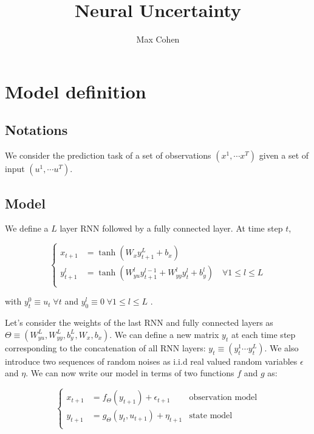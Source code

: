 \documentclass[10pt,a4paper]{report}
\begin{document}
\title{Neural Uncertainty}
\author{Max Cohen}
\maketitle

\chapter{Model definition}
\section{Notations}
We consider the prediction task of a set of observations $(x^1, \cdots x^T)$ given a set of input $(u^1, \cdots u^T)$.

\section{Model}
We define a $L$ layer RNN followed by a fully connected layer. At time step $t$,

\begin{equation*}
    \left\{
    \begin{aligned}
        x_{t+1}   & = \tanh(W_x y_{t+1}^L + b_x)                                                               \\
        y_{t+1}^l & = \tanh(W_{yu}^l y^{l-1}_{t+1} + W_{yy}^l y^{l}_{t} + b_y^l) \quad \forall 1 \leq l \leq L \\
    \end{aligned}
    \right.
\end{equation*}

with $y_{t}^0 \equiv u_{t} \; \forall t$ and $y_{0}^l \equiv 0 \; \forall 1 \leq l \leq L$ .

Let's consider the weights of the last RNN and fully connected layers as $\Theta \equiv (W_{yu}^L, W_{yy}^L, b_y^L, W_x, b_x)$. We can define a new matrix $y_t$ at each time step corresponding to the concatenation of all RNN layers: $y_t \equiv (y_t^1 \cdots y_t^L)$. We also introduce two sequences of random noises as i.i.d real valued random variables $\epsilon$ and $\eta$. We can now write our model in terms of two functions $f$ and $g$ as:

\begin{equation}
    \left\{
    \begin{aligned}
        x_{t+1} & = f_\Theta(y_{t+1}) + \epsilon_{t+1}    & \text{observation model} \\
        y_{t+1} & = g_\Theta(y_{t}, u_{t+1}) + \eta_{t+1} & \text{state model}       \\
    \end{aligned}
    \right.
\end{equation}
\end{document}
